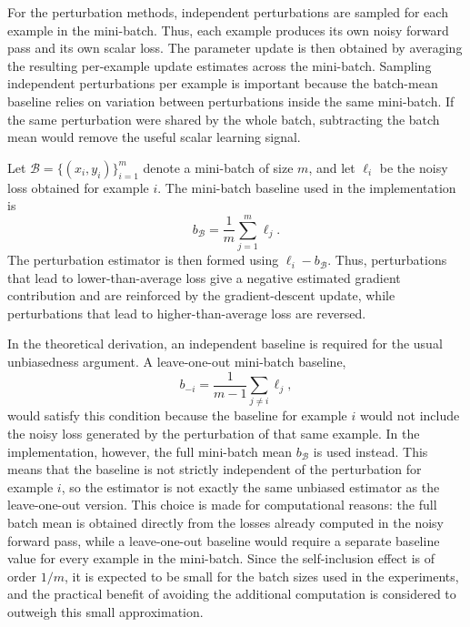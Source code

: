 For the perturbation methods, independent perturbations are sampled for each example in the mini-batch. Thus, each example produces its own noisy forward pass and its own scalar loss. The parameter update is then obtained by averaging the resulting per-example update estimates across the mini-batch. Sampling independent perturbations per example is important because the batch-mean baseline relies on variation between perturbations inside the same mini-batch. If the same perturbation were shared by the whole batch, subtracting the batch mean would remove the useful scalar learning signal.

Let \(\mathcal{B}=\{(x_i,y_i)\}_{i=1}^m\) denote a mini-batch of size \(m\), and let \(\ell_i\) be the noisy loss obtained for example \(i\). The mini-batch baseline used in the implementation is
\[
    b_{\mathcal{B}}
    =
    \frac{1}{m}\sum_{j=1}^m \ell_j .
\]
The perturbation estimator is then formed using \(\ell_i-b_{\mathcal{B}}\). Thus, perturbations that lead to lower-than-average loss give a negative estimated gradient contribution and are reinforced by the gradient-descent update, while perturbations that lead to higher-than-average loss are reversed.

In the theoretical derivation, an independent baseline is required for the usual unbiasedness argument. A leave-one-out mini-batch baseline,
\[
    b_{-i}
    =
    \frac{1}{m-1}\sum_{j\neq i}\ell_j,
\]
would satisfy this condition because the baseline for example \(i\) would not include the noisy loss generated by the perturbation of that same example. In the implementation, however, the full mini-batch mean \(b_{\mathcal{B}}\) is used instead. This means that the baseline is not strictly independent of the perturbation for example \(i\), so the estimator is not exactly the same unbiased estimator as the leave-one-out version. This choice is made for computational reasons: the full batch mean is obtained directly from the losses already computed in the noisy forward pass, while a leave-one-out baseline would require a separate baseline value for every example in the mini-batch. Since the self-inclusion effect is of order \(1/m\), it is expected to be small for the batch sizes used in the experiments, and the practical benefit of avoiding the additional computation is considered to outweigh this small approximation.

\newcommand{\algorithmicrowspacing}{\setlength{\itemsep}{0.35em}}

